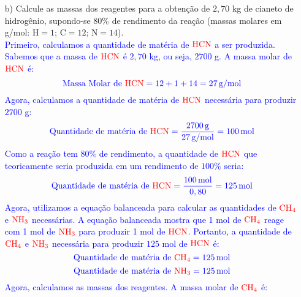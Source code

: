 \documentclass[a4paper, 12pt]{article}
\begin{document}
\begin{enumerate}
\begin{enumerate}[align=left, labelsep=-0.5em]
              \item[b)] Calcule as massas dos reagentes para a obtenção de $2,70$ kg de
                    cianeto de hidrogênio, supondo-se $80\%$ de rendimento da reação (massas
                    molares em g/mol: $\text{H}= 1$; $\text{C}= 12$; $\text{N}= 14$).
                    \\[10pt]
                    \textcolor{blue}{Primeiro, calculamos a quantidade de matéria de \(\textcolor{red}{\text{HCN}}\) a ser produzida. Sabemos que a massa de \(\textcolor{red}{\text{HCN}}\) é $2,70$ kg, ou seja, $2700$ g. A massa molar de \(\textcolor{red}{\text{HCN}}\) é:}
                    \[
                        \textcolor{blue}{\text{Massa Molar de } \textcolor{red}{\text{HCN}} = 12 + 1 + 14 = 27 \, \text{g/mol}}
                    \]
                    \textcolor{blue}{Agora, calculamos a quantidade de matéria de \(\textcolor{red}{\text{HCN}}\) necessária para produzir $2700$ g:}
                    \[
                        \textcolor{blue}{\text{Quantidade de matéria de } \textcolor{red}{\text{HCN}} = \frac{2700 \, \text{g}}{27 \, \text{g/mol}} = 100 \, \text{mol}}
                    \]
                    \textcolor{blue}{Como a reação tem $80\%$ de rendimento, a quantidade de \(\textcolor{red}{\text{HCN}}\) que teoricamente seria produzida em um rendimento de $100\%$ seria:}
                    \[
                        \textcolor{blue}{\text{Quantidade de matéria de } \textcolor{red}{\text{HCN}} = \frac{100 \, \text{mol}}{0,80} = 125 \, \text{mol}}
                    \]
                    \textcolor{blue}{Agora, utilizamos a equação balanceada para calcular as quantidades de \(\textcolor{red}{\text{CH}_4}\) e \(\textcolor{red}{\text{NH}_3}\) necessárias. A equação balanceada mostra que 1 mol de \(\textcolor{red}{\text{CH}_4}\) reage com 1 mol de \(\textcolor{red}{\text{NH}_3}\) para produzir 1 mol de \(\textcolor{red}{\text{HCN}}\). Portanto, a quantidade de \(\textcolor{red}{\text{CH}_4}\) e \(\textcolor{red}{\text{NH}_3}\) necessária para produzir $125$ mol de \(\textcolor{red}{\text{HCN}}\) é:}
                    \[
                        \textcolor{blue}{\text{Quantidade de matéria de } \textcolor{red}{\text{CH}_4} = 125 \, \text{mol}}
                    \]
                    \[
                        \textcolor{blue}{\text{Quantidade de matéria de } \textcolor{red}{\text{NH}_3} = 125 \, \text{mol}}
                    \]
                    \textcolor{blue}{Agora, calculamos as massas dos reagentes. A massa molar de \(\textcolor{red}{\text{CH}_4}\) é:}

\end{enumerate}
\end{enumerate}
\end{document}
